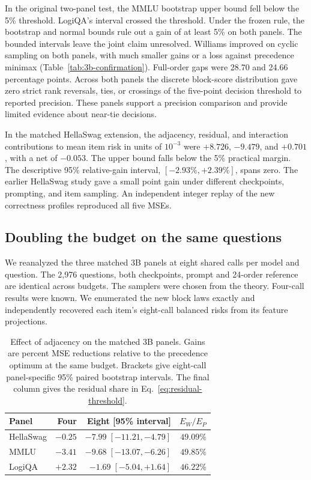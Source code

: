 \documentclass{article}
\begin{document}
In the original two-panel test, the MMLU bootstrap upper bound
fell below the 5\% threshold.
LogiQA's interval crossed the threshold. Under the frozen rule,
the bootstrap and normal bounds rule out a gain of at least
5\% on both panels. The bounded intervals leave the joint
claim unresolved. Williams improved on cyclic sampling on
both panels, with much smaller gains or a loss against
precedence minimax (Table~\ref{tab:3b-confirmation}). Full-order
gaps were 28.70 and 24.66 percentage points. Across both
panels the discrete block-score distribution gave zero strict
rank reversals, ties, or crossings of the five-point decision
threshold to reported precision. These panels support a precision
comparison and provide limited evidence about near-tie decisions.

In the matched HellaSwag extension, the adjacency, residual, and
interaction contributions to mean item risk in units of $10^{-3}$
were \(+8.726\), \(-9.479\),
and \(+0.701\), with a net of
\(-0.053\).
The upper bound falls below the 5\% practical margin. The descriptive
95\% relative-gain interval, $[-2.93\%,+2.39\%]$, spans zero. The
earlier HellaSwag study gave a small point gain under different
checkpoints, prompting, and item sampling. An independent integer
replay of the new correctness profiles reproduced all five MSEs.

\subsection{Doubling the budget on the same questions}
\label{sec:eight-replay}
We reanalyzed the three matched 3B panels at eight shared calls per
model and question. The 2,976 questions, both checkpoints, prompt and
24-order reference are identical across budgets. The samplers were
chosen from the theory. Four-call results were known. We enumerated
the new block laws exactly and independently recovered each item's
eight-call balanced risks from its feature projections.

\begin{table}[t]
\centering
\small
\setlength{\tabcolsep}{3.5pt}
\caption{Effect of adjacency on the matched 3B panels. Gains are
percent MSE reductions relative to the precedence optimum at the same
budget. Brackets give eight-call panel-specific 95\% paired bootstrap
intervals. The final column gives the residual share in
Eq.~\eqref{eq:residual-threshold}.}
\label{tab:eight}
\begin{tabular}{@{}lrrr@{}}
\toprule
Panel & Four & Eight [95\% interval] & $E_W/E_P$ \\
\midrule
HellaSwag & $-0.25$ & $-7.99\;[-11.21,-4.79]$ & $49.09\%$ \\
MMLU & $-3.41$ & $-9.68\;[-13.07,-6.26]$ & $49.85\%$ \\
LogiQA & $+2.32$ & $-1.69\;[-5.04,+1.64]$ & $46.22\%$ \\
\bottomrule
\end{tabular}
\end{table}
\end{document}
